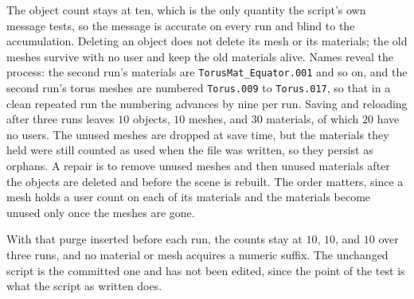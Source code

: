 The object count stays at ten, which is the only quantity the script's own message tests, so the message is accurate on every run and blind to the accumulation. Deleting an object does not delete its mesh or its materials; the old meshes survive with no user and keep the old materials alive. Names reveal the process: the second run's materials are \texttt{TorusMat\_Equator.001} and so on, and the second run's torus meshes are numbered \texttt{Torus.009} to \texttt{Torus.017}, so that in a clean repeated run the numbering advances by nine per run. Saving and reloading after three runs leaves $10$ objects, $10$ meshes, and $30$ materials, of which $20$ have no users. The unused meshes are dropped at save time, but the materials they held were still counted as used when the file was written, so they persist as orphans. A repair is to remove unused meshes and then unused materials after the objects are deleted and before the scene is rebuilt. The order matters, since a mesh holds a user count on each of its materials and the materials become unused only once the meshes are gone.



With that purge inserted before each run, the counts stay at $10$, $10$, and $10$ over three runs, and no material or mesh acquires a numeric suffix. The unchanged script is the committed one and has not been edited, since the point of the test is what the script as written does.

